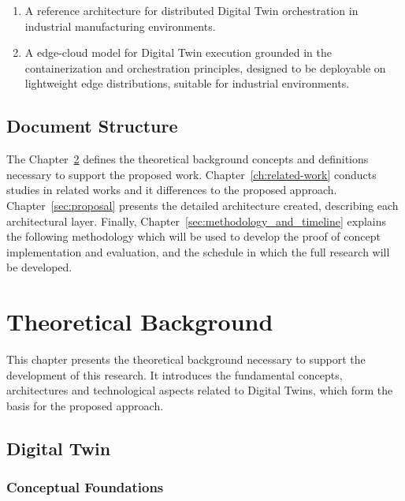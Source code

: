 \begin{enumerate}
    \item A reference architecture for distributed Digital Twin orchestration in industrial manufacturing environments.
    \item A edge-cloud model for Digital Twin execution grounded in the containerization and orchestration principles, designed to be deployable on lightweight edge distributions, suitable for industrial environments.
\end{enumerate}

\section{Document Structure}
\label{ch:document-structure}
The Chapter~\ref{ch:theoretical-background} defines the theoretical background concepts and definitions necessary to
support the proposed work. Chapter~\ref{ch:related-work} conducts studies in related works and it differences
to the proposed approach. Chapter~\ref{sec:proposal} presents the detailed architecture created, describing
each architectural layer. Finally, Chapter~\ref{sec:methodology_and_timeline} explains the following methodology which will be used to
develop the proof of concept implementation and evaluation, and the schedule in which the full research will be developed.

\chapter{Theoretical Background}
\label{ch:theoretical-background}

This chapter presents the theoretical background necessary to support the development
of this research. It introduces the fundamental concepts, architectures and technological
aspects related to Digital Twins, which form the basis for the proposed approach.

\section{Digital Twin}
\label{sec:digital_twin}
\subsection{Conceptual Foundations}

